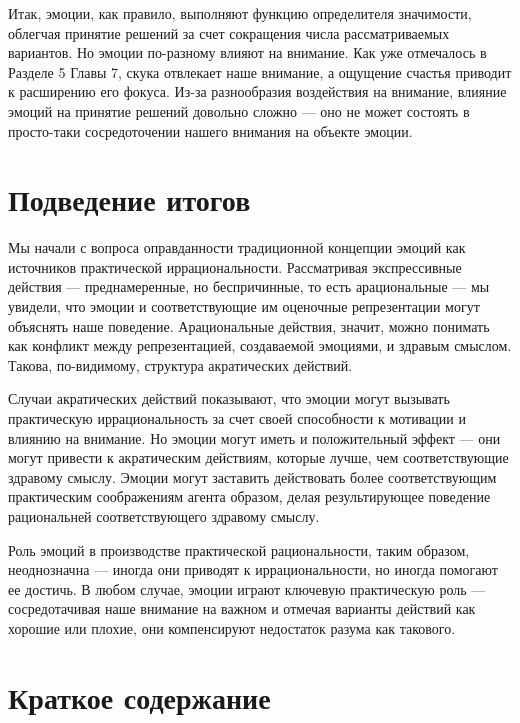 \documentclass[11pt]{book}
\begin{document}
Итак, эмоции, как правило, выполняют функцию определителя значимости, облегчая принятие решений за счет сокращения числа рассматриваемых вариантов. Но эмоции по-разному влияют на внимание. Как уже отмечалось в Разделе 5 Главы 7, скука отвлекает наше внимание, а ощущение счастья приводит к расширению его фокуса. Из-за разнообразия воздействия на внимание, влияние эмоций на принятие решений довольно сложно --- оно не может состоять в просто-таки сосредоточении нашего внимания на объекте эмоции.

\section{Подведение итогов}

Мы начали с вопроса оправданности традиционной концепции эмоций как источников практической иррациональности. Рассматривая экспрессивные действия --- преднамеренные, но беспричинные, то есть арациональные --- мы увидели, что эмоции и соответствующие им оценочные репрезентации могут объяснять наше поведение. Арациональные действия, значит, можно понимать как конфликт между репрезентацией, создаваемой эмоциями, и здравым смыслом. Такова, по-видимому, структура акратических действий.

Случаи акратических действий показывают, что эмоции могут вызывать практическую иррациональность за счет своей способности к мотивации и влиянию на внимание. Но эмоции могут иметь и положительный эффект --- они могут привести к акратическим действиям, которые лучше, чем соответствующие здравому смыслу. Эмоции могут заставить действовать более соответствующим практическим соображениям агента образом, делая результирующее поведение рациональней соответствующего здравому смыслу.

Роль эмоций в производстве практической рациональности, таким образом, неоднозначна --- иногда они приводят к иррациональности, но иногда помогают ее достичь. В любом случае, эмоции играют ключевую практическую роль --- сосредотачивая наше внимание на важном и отмечая варианты действий как хорошие или плохие, они компенсируют недостаток разума как такового.

\section{Краткое содержание}
\end{document}
